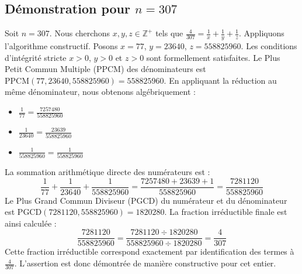 \documentclass[11pt,a4paper]{article}
\begin{document}
\subsection{Démonstration pour $n = 307$}
Soit $n = 307$. Nous cherchons $x, y, z \in \mathbb{Z}^{+}$ tels que $\frac{4}{307} = \frac{1}{x} + \frac{1}{y} + \frac{1}{z}$.
Appliquons l'algorithme constructif. Posons $x = 77$, $y = 23640$, $z = 558825960$.
Les conditions d'intégrité stricte $x > 0$, $y > 0$ et $z > 0$ sont formellement satisfaites.
Le Plus Petit Commun Multiple (PPCM) des dénominateurs est $\text{PPCM}(77, 23640, 558825960) = 558825960$.
En appliquant la réduction au même dénominateur, nous obtenons algébriquement :
\begin{itemize}
    \item $\frac{1}{77} = \frac{7257480}{558825960}$
    \item $\frac{1}{23640} = \frac{23639}{558825960}$
    \item $\frac{1}{558825960} = \frac{1}{558825960}$
\end{itemize}
La sommation arithmétique directe des numérateurs est :
$$ \frac{1}{77} + \frac{1}{23640} + \frac{1}{558825960} = \frac{7257480 + 23639 + 1}{558825960} = \frac{7281120}{558825960} $$
Le Plus Grand Commun Diviseur (PGCD) du numérateur et du dénominateur est $\text{PGCD}(7281120, 558825960) = 1820280$.
La fraction irréductible finale est ainsi calculée :
$$ \frac{7281120}{558825960} = \frac{7281120 \div 1820280}{558825960 \div 1820280} = \frac{4}{307} $$
Cette fraction irréductible correspond exactement par identification des termes à $\frac{4}{307}$. L'assertion est donc démontrée de manière constructive pour cet entier.
\end{document}
